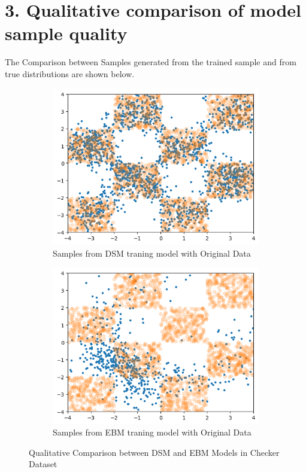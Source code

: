 \documentclass[11pt]{article}
\begin{document}
	\section*{3. Qualitative comparison of model sample quality}
	The Comparison between Samples generated from the trained sample and from true distributions are shown below.
	\begin{figure}[H]
		\centering 
		\begin{subfigure}{0.45\textwidth}
			\centering
			\includegraphics[width=\textwidth]{DSM_Checker.png}
			\caption{Samples from DSM traning model with Original Data}
			\label{fig:DSMChecker}
		\end{subfigure}
		\hfill
		\begin{subfigure}{0.45\textwidth}
			\centering
			\includegraphics[width=\textwidth]{EBM.png}
			\caption{Samples from EBM traning model with Original Data}
			\label{fig:EBMChecker}
		\end{subfigure}
		\caption{Qualitative Comparison between DSM and EBM Models in Checker Dataset}
		\label{Chekcer}
	\end{figure}
\end{document}
